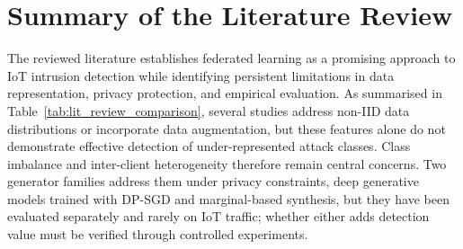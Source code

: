 \section{Summary of the Literature Review}\label{sec:lit_summary}
The reviewed literature establishes federated learning as a promising approach to IoT intrusion detection while identifying persistent limitations in data representation, privacy protection, and empirical evaluation. As summarised in Table~\ref{tab:lit_review_comparison}, several studies address non-IID data distributions or incorporate data augmentation, but these features alone do not demonstrate effective detection of under-represented attack classes. Class imbalance and inter-client heterogeneity therefore remain central concerns. Two generator families address them under privacy constraints, deep generative models trained with DP-SGD and marginal-based synthesis, but they have been evaluated separately and rarely on IoT traffic; whether either adds detection value must be verified through controlled experiments.

